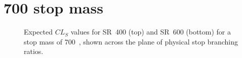 \FloatBarrier

\newpage
\section{700 \texorpdfstring{\GeV}{GeV} stop mass}

\begin{figure}[ht]
  \centering
  \caption{
    Expected
    $CL_S$ values for SR~400 (top) and SR~600 (bottom) for a stop mass of
    700~\GeV,
    shown across the plane of physical stop branching ratios.
  }
\end{figure}

